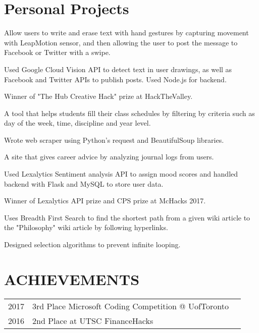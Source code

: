 \documentclass[]{deedy-resume-openfont}
\begin{document}
\begin{minipage}[t]{0.66\textwidth}
\section{Personal Projects}
\begin{tightemize}
\item Allow users to write and erase text with hand gestures by capturing movement with LeapMotion sensor, and then allowing the user to post the message to Facebook or Twitter with a swipe. 
\item Used Google Cloud Vision API to detect text in user drawings, as well as Facebook and Twitter APIs to publish posts. Used Node.js for backend.
\item Winner of "The Hub Creative Hack" prize at HackTheValley.
\end{tightemize}
\sectionsep

\begin{tightemize}
\item A tool that helps students fill their class schedules by filtering by criteria such as day of the week, time, discipline and year level.
\item Wrote web scraper using Python's request and BeautifulSoup libraries.
\end{tightemize}
\sectionsep

\begin{tightemize}
\item A site that gives career advice by analyzing journal logs from users.
\item Used Lexalytics Sentiment analysis API to assign mood scores and handled backend with Flask and MySQL to store user data.
\item Winner of Lexalytics API prize and CPS prize at McHacks 2017.
\end{tightemize}
\sectionsep

\begin{tightemize}
\item Uses Breadth First Search to find the shortest path from a given wiki article to the "Philosophy" wiki article by following hyperlinks. 
\item Designed selection algorithms to prevent infinite looping.
\end{tightemize}
\sectionsep


\section{ACHIEVEMENTS} 
\begin{tabular}{rll}
2017	     & 3rd Place Microsoft Coding Competition @ UofToronto\\
2016	     & 2nd Place at UTSC FinanceHacks\\

\end{tabular}
\sectionsep

\end{minipage} 
\end{document}
